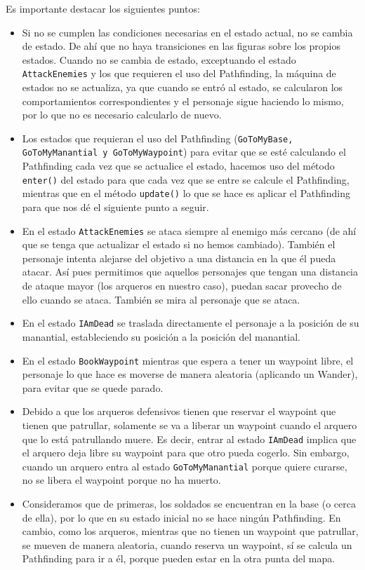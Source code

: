 Es importante destacar los siguientes puntos:
\begin{itemize}
 \item Si no se cumplen las condiciones necesarias en el estado actual, no se cambia de estado. De ahí que no haya transiciones en las figuras sobre los propios estados. Cuando no se cambia de estado, exceptuando el estado \texttt{AttackEnemies} y los que requieren el uso del Pathfinding, la máquina de estados no se actualiza, ya que cuando se entró al estado, se calcularon los comportamientos correspondientes y el personaje sigue haciendo lo mismo, por lo que no es necesario calcularlo de nuevo.
 
 \item Los estados que requieran el uso del Pathfinding (\texttt{GoToMyBase, GoToMyManantial y GoToMyWaypoint}) para evitar que se esté calculando el Pathfinding cada vez que se actualice el estado, hacemos uso del método \texttt{enter()} del estado para que cada vez que se entre se calcule el Pathfinding, mientras que en el método \texttt{update()} lo que se hace es aplicar el Pathfinding para que nos dé el siguiente punto a seguir.
 
 \item En el estado \texttt{AttackEnemies} se ataca siempre al enemigo más cercano (de ahí que se tenga que actualizar el estado si no hemos cambiado). También el personaje intenta alejarse del objetivo a una distancia en la que él pueda atacar. Así pues permitimos que aquellos personajes que tengan una distancia de ataque mayor (los arqueros en nuestro caso), puedan sacar provecho de ello cuando se ataca. También se mira al personaje que se ataca.
 
 \item En el estado \texttt{IAmDead} se traslada directamente el personaje a la posición de su manantial, estableciendo su posición a la posición del manantial.
 
 \item En el estado \texttt{BookWaypoint} mientras que espera a tener un waypoint libre, el personaje lo que hace es moverse de manera aleatoria (aplicando un Wander), para evitar que se quede parado.
 
 \item Debido a que los arqueros defensivos tienen que reservar el waypoint que tienen que patrullar, solamente se va a liberar un waypoint cuando el arquero que lo está patrullando muere. Es decir, entrar al estado \texttt{IAmDead} implica que el arquero deja libre su waypoint para que otro pueda cogerlo. Sin embargo, cuando un arquero entra al estado \texttt{GoToMyManantial} porque quiere curarse, no se libera el waypoint porque no ha muerto. 
 
 \item Consideramos que de primeras, los soldados se encuentran en la base (o cerca de ella), por lo que en su estado inicial no se hace ningún Pathfinding. En cambio, como los arqueros, mientras que no tienen un waypoint que patrullar, se mueven de manera aleatoria, cuando reserva un waypoint, sí se calcula un Pathfinding para ir a él, porque pueden estar en la otra punta del mapa.
\end{itemize}



